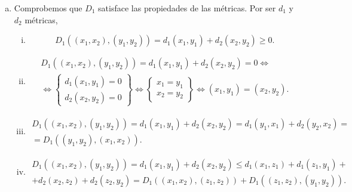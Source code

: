 \begin{eje}
    \begin{enumerate}[(a)]
        \item Comprobemos que $D_1$ satisface las propiedades de las métricas. Por ser $d_1$ y $d_2$ métricas,
        \begin{enumerate}[i)]
            \item 
            \[
                D_1 \left( \left( x_1, x_2 \right) , \left( y_1 , y_2 \right) \right) = d_1 \left( x_1, y_1\right) + d_2 \left( x_2 , y_2 \right) \geq 0.
            \]
            \item 
            \begin{gather*}
                D_1 \left( \left( x_1, x_2 \right) , \left( y_1 , y_2 \right) \right) = d_1 \left( x_1, y_1\right) + d_2 \left( x_2 , y_2 \right) = 0 \iff \\
                \iff \left\{ \begin{array}{c}
                    d_1 \left( x_1, y_1 \right) = 0 \\
                    d_2 \left( x_2, y_2 \right) = 0
                \end{array} \right\} \iff \left\{ \begin{array}{c}
                    x_1=y_1 \\
                    x_2=y_2
                \end{array} \right\} \iff \left( x_1, y_1 \right) = \left( x_2, y_2 \right).
            \end{gather*}
            \item 
            \begin{gather*}
                D_1 \left( \left( x_1, x_2 \right) , \left( y_1 , y_2 \right) \right) = d_1 \left( x_1, y_1 \right) + d_2 \left( x_2 , y_2 \right) = d_1 \left( y_1, x_1 \right) + d_2 \left( y_2 , x_2 \right)= \\
                =D_1 \left( \left( y_1, y_2 \right) , \left( x_1 , x_2 \right) \right) .
            \end{gather*}
            \item 
            \begin{gather*}
                D_1 \left( \left( x_1, x_2 \right) , \left( y_1 , y_2 \right) \right) = d_1 \left( x_1, y_1 \right) + d_2 \left( x_2 , y_2 \right) \leq d_1 \left( x_1, z_1 \right) + d_1 \left( z_1, y_1 \right) + \\
                + d_2 \left( x_2, z_2 \right) + d_2 \left( z_2, y_2 \right) = D_1 \left( \left( x_1, x_2 \right) , \left( z_1 , z_2 \right) \right) + D_1 \left( \left( z_1, z_2 \right) , \left( y_1 , y_2 \right) \right).

\end{gather*}
\end{enumerate}
\end{enumerate}
\end{eje}
